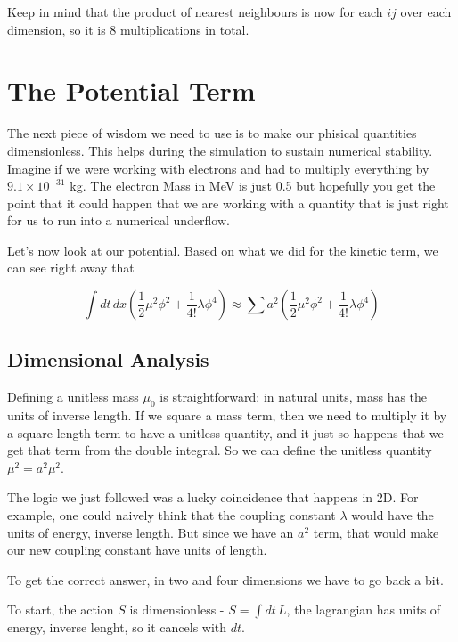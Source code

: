 Keep in mind that the product of nearest neighbours is now for each $ij$ over each dimension, so it is 8 multiplications in total.





\section{The Potential Term}

The next piece of wisdom we need to use is to make our phisical quantities dimensionless.
This helps during the simulation to sustain numerical stability.
Imagine if we were working with electrons and had to multiply everything by $9.1 \times 10^{-31}$ kg.
The electron Mass in MeV is just 0.5 but hopefully you get the point that
it could happen that we are working with a quantity that is just right for us to run into a numerical
underflow.

Let's now look at our potential.
Based on what we did for the kinetic term, we can see right away that

$$
\int dt \, dx \left( \frac{1}{2} \mu^{2} \phi^2 + \frac{1}{4!} \lambda \phi^4 \right)
\approx \sum a^2 \left( \frac{1}{2} \mu^{2} \phi^2 + \frac{1}{4!} \lambda \phi^4 \right)
$$


\subsection{Dimensional Analysis}

Defining a unitless mass $\mu_0$ is straightforward: in natural units, mass has the units of inverse length.
If we square a mass term, then we need to multiply it by a square length term to have a unitless quantity,
and it just so happens that we get that term from the double integral.
So we can define the unitless quantity $\mu^{2} = a^2 \mu^{2}$.

The logic we just followed was a lucky coincidence that happens in 2D.
For example, one could naively think that the coupling constant $\lambda$ would have the units of energy, inverse length.
But since we have an $a^2$ term, that would make our new coupling constant have units of length.

To get the correct answer, in two and four dimensions we have to go back a bit.

To start, the action $S$ is dimensionless - $S = \int dt \, L$, the lagrangian has units of energy,
inverse lenght, so it cancels with $dt$.

